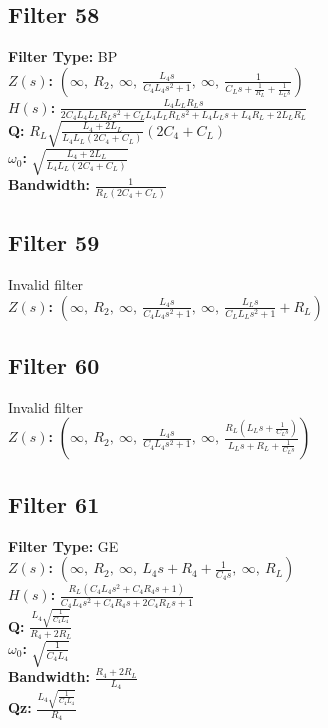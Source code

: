 \documentclass{article}
\begin{document}
\subsection*{Filter 58}
\textbf{Filter Type:} BP \\ 
\textbf{$Z(s)$:} $\left( \infty, \  R_{2}, \  \infty, \  \frac{L_{4} s}{C_{4} L_{4} s^{2} + 1}, \  \infty, \  \frac{1}{C_{L} s + \frac{1}{R_{L}} + \frac{1}{L_{L} s}}\right)$ \\ 
\textbf{$H(s)$:} $\frac{L_{4} L_{L} R_{L} s}{2 C_{4} L_{4} L_{L} R_{L} s^{2} + C_{L} L_{4} L_{L} R_{L} s^{2} + L_{4} L_{L} s + L_{4} R_{L} + 2 L_{L} R_{L}}$ \\ 
\textbf{Q:} $R_{L} \sqrt{\frac{L_{4} + 2 L_{L}}{L_{4} L_{L} \left(2 C_{4} + C_{L}\right)}} \left(2 C_{4} + C_{L}\right)$ \\ 
\textbf{$\omega_0$:} $\sqrt{\frac{L_{4} + 2 L_{L}}{L_{4} L_{L} \left(2 C_{4} + C_{L}\right)}}$ \\ 
\textbf{Bandwidth:} $\frac{1}{R_{L} \left(2 C_{4} + C_{L}\right)}$ \\ 
\subsection*{Filter 59}
Invalid filter \\ 
\textbf{$Z(s)$:} $\left( \infty, \  R_{2}, \  \infty, \  \frac{L_{4} s}{C_{4} L_{4} s^{2} + 1}, \  \infty, \  \frac{L_{L} s}{C_{L} L_{L} s^{2} + 1} + R_{L}\right)$ \\ 
\subsection*{Filter 60}
Invalid filter \\ 
\textbf{$Z(s)$:} $\left( \infty, \  R_{2}, \  \infty, \  \frac{L_{4} s}{C_{4} L_{4} s^{2} + 1}, \  \infty, \  \frac{R_{L} \left(L_{L} s + \frac{1}{C_{L} s}\right)}{L_{L} s + R_{L} + \frac{1}{C_{L} s}}\right)$ \\ 
\subsection*{Filter 61}
\textbf{Filter Type:} GE \\ 
\textbf{$Z(s)$:} $\left( \infty, \  R_{2}, \  \infty, \  L_{4} s + R_{4} + \frac{1}{C_{4} s}, \  \infty, \  R_{L}\right)$ \\ 
\textbf{$H(s)$:} $\frac{R_{L} \left(C_{4} L_{4} s^{2} + C_{4} R_{4} s + 1\right)}{C_{4} L_{4} s^{2} + C_{4} R_{4} s + 2 C_{4} R_{L} s + 1}$ \\ 
\textbf{Q:} $\frac{L_{4} \sqrt{\frac{1}{C_{4} L_{4}}}}{R_{4} + 2 R_{L}}$ \\ 
\textbf{$\omega_0$:} $\sqrt{\frac{1}{C_{4} L_{4}}}$ \\ 
\textbf{Bandwidth:} $\frac{R_{4} + 2 R_{L}}{L_{4}}$ \\ 
\textbf{Qz:} $\frac{L_{4} \sqrt{\frac{1}{C_{4} L_{4}}}}{R_{4}}$ \\ 
\end{document}
